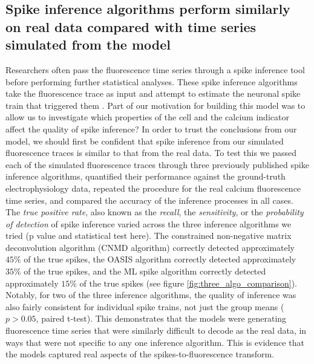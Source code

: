 \subsection{Spike inference algorithms perform similarly on real data compared with time series simulated from the model}\label{sec:algo_comparison}
Researchers often pass the fluorescence time series through a spike inference tool before performing further statistical analyses. These spike inference algorithms take the fluorescence trace as input and attempt to estimate the neuronal spike train that triggered them \parencite{vogelstein, pnevmatikakis, friedrich, paninski1, paninski2, deneux}. Part of our motivation for building this model was to allow us to investigate which properties of the cell and the calcium indicator affect the quality of spike inference? In order to trust the conclusions from our model, we should first be confident that spike inference from our simulated fluorescence traces is similar to that from the real data. To test this we passed each of the simulated fluorescence traces through three previously published spike inference algorithms, quantified their performance against the ground-truth electrophysiology data, repeated the procedure for the real calcium fluorescence time series, and compared the accuracy of the inference processes in all cases. The \textit{true positive rate}, also known as the \textit{recall}, the \textit{sensitivity}, or the \textit{probability of detection} of spike inference varied across the three inference algorithms we tried (p value and statistical test here). The constrained non-negative matrix deconvolution algorithm  \parencite{pnevmatikakis} (CNMD algorithm) correctly detected approximately $45\%$ of the true spikes, the OASIS algorithm  \parencite{friedrich} correctly detected approximately $35\%$ of the true spikes, and the ML spike algorithm  \parencite{deneux} correctly detected approximately $15\%$ of the true spikes (see figure \ref{fig:three_algo_comparison}). Notably, for two of the three inference algorithms, the quality of inference was also fairly consistent for individual spike trains, not just the group means ($p > 0.05$, paired t-test). This demonstrates that the models were generating fluorescence time series that were similarly difficult to decode as the real data, in ways that were not specific to any one inference algorithm. This is evidence that the models captured real aspects of the spikes-to-fluorescence transform.
